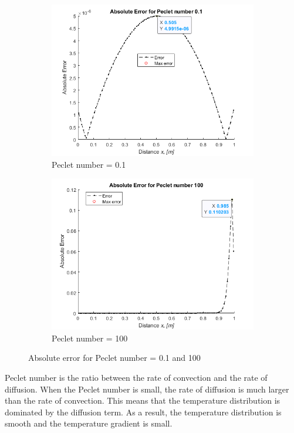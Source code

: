 \begin{figure}[H]
    \centering
    \begin{subfigure}{0.7\textwidth}
        \centering
        \includegraphics[width=\textwidth]{Questions/Code/error_0.1.png}
        \caption{Peclet number = 0.1}
    \end{subfigure}
    \begin{subfigure}{0.7\textwidth}
        \centering
        \includegraphics[width=\textwidth]{Questions/Code/error_100.png}
        \caption{Peclet number = 100}
    \end{subfigure}
    \caption{Absolute error for Peclet number = 0.1 and 100}
\end{figure}
Peclet number is the ratio between the rate of convection and the rate of diffusion. When the Peclet number is small, the rate of diffusion is much larger than the rate of convection. This means that the temperature distribution is dominated by the diffusion term. As a result, the temperature distribution is smooth and the temperature gradient is small. 


